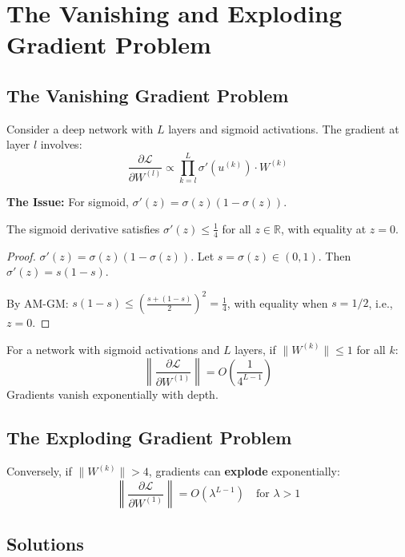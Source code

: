 \documentclass[main.tex]{subfiles}
\begin{document}
\newpage
\section{The Vanishing and Exploding Gradient Problem}

\subsection{The Vanishing Gradient Problem}

Consider a deep network with $L$ layers and sigmoid activations. The gradient at layer $l$ involves:
$$\frac{\partial \mathcal{L}}{\partial W^{(l)}} \propto \prod_{k=l}^{L} \sigma'(u^{(k)}) \cdot W^{(k)}$$

\textbf{The Issue:} For sigmoid, $\sigma'(z) = \sigma(z)(1-\sigma(z))$.

\begin{proposition}
The sigmoid derivative satisfies $\sigma'(z) \leq \frac{1}{4}$ for all $z \in \mathbb{R}$, with equality at $z = 0$.
\end{proposition}

\begin{proof}
$\sigma'(z) = \sigma(z)(1-\sigma(z))$. Let $s = \sigma(z) \in (0,1)$. Then $\sigma'(z) = s(1-s)$.

By AM-GM: $s(1-s) \leq \left(\frac{s + (1-s)}{2}\right)^2 = \frac{1}{4}$, with equality when $s = 1/2$, i.e., $z = 0$.
\end{proof}

\begin{theorem}
For a network with sigmoid activations and $L$ layers, if $\|W^{(k)}\| \leq 1$ for all $k$:
$$\left\|\frac{\partial \mathcal{L}}{\partial W^{(1)}}\right\| = O\left(\frac{1}{4^{L-1}}\right)$$
Gradients vanish exponentially with depth.
\end{theorem}

\subsection{The Exploding Gradient Problem}

Conversely, if $\|W^{(k)}\| > 4$, gradients can \textbf{explode} exponentially:
$$\left\|\frac{\partial \mathcal{L}}{\partial W^{(1)}}\right\| = O\left(\lambda^{L-1}\right) \quad \text{for } \lambda > 1$$

\subsection{Solutions}
\end{document}
